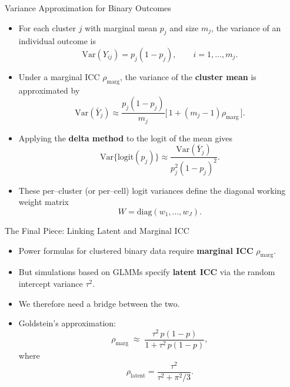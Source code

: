 \documentclass[aspectratio=169]{beamer} %
\begin{document}
\begin{frame}{Variance Approximation for Binary Outcomes}

\begin{itemize}
  \item For each cluster $j$ with marginal mean $p_j$ and size $m_j$,
        the variance of an individual outcome is
    \[
      \mathrm{Var}(Y_{ij}) = p_j(1 - p_j),
      \qquad i = 1,\dots,m_j.
    \]

  \item Under a marginal ICC $\rho_{\text{marg}}$, the variance of the
        \textbf{cluster mean} is approximated by
    \[
      \mathrm{Var}(\bar Y_j)
      \approx
      \frac{p_j(1 - p_j)}{m_j}
      \Big[\,1 + (m_j - 1)\rho_{\text{marg}}\,\Big].
    \]

  \item Applying the \textbf{delta method} to the logit of the mean gives
    \[
      \mathrm{Var}\{\text{logit}(p_j)\}
      \approx
      \frac{\mathrm{Var}(\bar Y_j)}{p_j^2(1 - p_j)^2}.
    \]

  \item These per–cluster (or per–cell) logit variances define the diagonal
        working weight matrix
    \[
      W = \mathrm{diag}(w_1,\dots,w_J).
    \]
\end{itemize}

\end{frame}
\begin{frame}{The Final Piece: Linking Latent and Marginal ICC}

\begin{itemize}
  \item Power formulas for clustered binary data require
        \textbf{marginal ICC} $\rho_{\text{marg}}$.
  \item But simulations based on GLMMs specify \textbf{latent ICC}
        via the random intercept variance $\tau^2$.
  \medskip

  \item We therefore need a bridge between the two.

  \item Goldstein’s approximation:
    \[
      \rho_{\text{marg}}
      \;\approx\;
      \frac{\tau^2\,p(1-p)}
           {1 + \tau^2\,p(1-p)},
    \]
    where
    \[
      \rho_{\text{latent}}
      = \frac{\tau^2}{\tau^2 + \pi^2/3}.
    \]
\end{itemize}

\end{frame}
\end{document}
